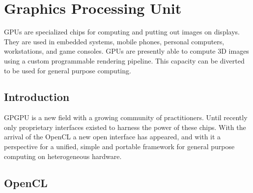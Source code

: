 %

\glsresetall
\chapter{Graphics Processing Unit}

\Glspl{GPU} are specialized chips for computing and putting out images on displays. They are used in embedded systems, mobile phones, personal computers, workstations, and game consoles. \Glspl{GPU} are presently able to compute 3D images using a custom programmable rendering pipeline. This capacity can be diverted to be used for general purpose computing.

\section{Introduction}

\Gls{GPGPU} is a new field with a growing community of practitioners. Until recently only proprietary interfaces existed to harness the power of these chips. With the arrival of the \gls{OpenCL} a new open interface has appeared, and with it a perspective for a unified, simple and portable framework for general purpose computing on heterogeneous hardware.

\section{OpenCL}

